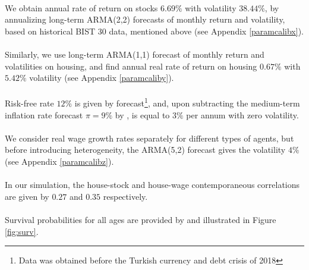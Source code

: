 \paragraph{}We obtain annual rate of return on stocks $6.69\%$ with volatility $38.44\%$, by annualizing long-term ARMA(2,2) forecasts of monthly return and volatility, based on historical BIST 30 data, mentioned above (see Appendix \ref{paramcalibx}).

\paragraph{}Similarly, we use long-term ARMA(1,1) forecast of monthly return and volatilities on housing, and find annual real rate of return on housing $0.67\%$ with $5.42\%$ volatility (see Appendix \ref{paramcaliby}).

\paragraph{}Risk-free rate $12\%$ is given by \citet{oecd} forecast\footnote{Data was obtained before the Turkish currency and debt crisis of 2018}, and, upon subtracting the medium-term inflation rate forecast $\pi = 9\%$ by \citet{tcmb}, is equal to $3\%$ per annum with zero volatility.

\paragraph{}We consider real wage growth rates separately for different types of agents, but before introducing heterogeneity, the ARMA(5,2) forecast gives the volatility $4\%$ (see Appendix \ref{paramcalibz}).

\paragraph{}In our simulation, the house-stock and house-wage contemporaneous correlations are given by $0.27$ and $0.35$ respectively. 

\paragraph{}Survival probabilities for all ages are provided by \citet{tuik2} and illustrated in Figure \ref{fig:surv}.

